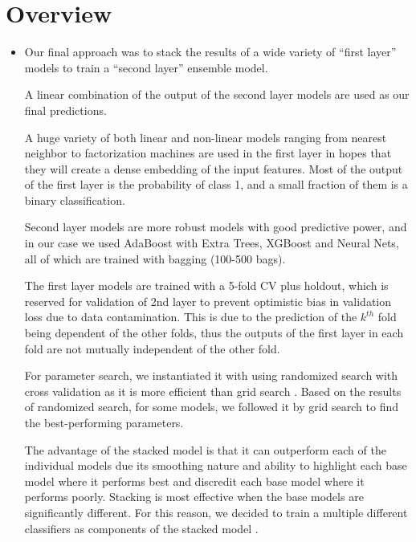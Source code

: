 \section{Overview}
\medskip
\begin{itemize}

    \item {}

        Our final approach was to stack the results of a wide variety of ``first layer'' models to train a ``second layer'' ensemble model.

        A linear combination of the output of the second layer models are used as our final predictions.

        A huge variety of both linear and non-linear models ranging from nearest neighbor to factorization machines\cite{juan2016field} are used in the first layer in hopes that they will create a dense embedding of the input features. Most of the output of the first layer is the probability of class 1, and a small fraction of them is a binary classification.

        Second layer models are more robust models with good predictive power, and in our case we used AdaBoost with Extra Trees, XGBoost and Neural Nets, all of which are trained with bagging (100-500 bags).

        The first layer models are trained with a 5-fold CV plus holdout, which is reserved for validation of 2nd layer to prevent optimistic bias in validation loss due to data contamination. This is due to the prediction of the $k^{th}$ fold being dependent of the other folds, thus the outputs of the first layer in each fold are not mutually independent of the other fold.

        For parameter search, we instantiated it with using randomized search with cross validation as it is more efficient than grid search \cite{bergstra2012random}. Based on the results of randomized search, for some models, we followed it by grid search to find the best-performing parameters.

        The advantage of the stacked model is that it can outperform each of the individual models due its smoothing nature and ability to highlight each base model where it performs best and discredit each base model where it performs poorly. Stacking is most effective when the base models are significantly different. For this reason, we decided to train a multiple different classifiers as components of the stacked model \cite{gunes2017stacking}.


\end{itemize}
